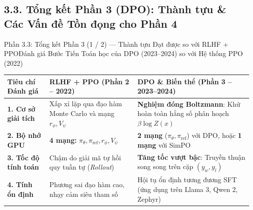 \subsection{3.3. Tổng kết Phần 3 (DPO): Thành tựu \& Các Vấn đề Tồn đọng cho Phần 4}

\begin{frame}{Phần 3.3: Tổng kết Phần 3 (1 / 2) --- Thành tựu Đạt được so với RLHF + PPO}{Đánh giá Bước Tiến Toán học của DPO (2023--2024) so với Hệ thống PPO (2022)}
  \vspace{0.05cm}
  \footnotesize
  \renewcommand{\arraystretch}{1.32}
  \begin{tabularx}{\textwidth}{@{}p{3.4cm} X X@{}}
    \toprule
    \textbf{Tiêu chí Đánh giá} & \textbf{RLHF + PPO (Phần 2 -- 2022)} & \textbf{DPO \& Biến thể (Phần 3 -- 2023--2024)} \\
    \midrule
    \textbf{1. Cơ sở giải tích} & Xấp xỉ lặp qua đạo hàm Monte Carlo và mạng $r_\phi, V_\psi$ & \textbf{\textcolor{tealgreen}{Nghiệm đóng Boltzmann}}: Khử hoàn toàn hằng số phân hoạch $\beta \log Z(x)$ \\
    \hline
    \textbf{2. Bộ nhớ GPU} & \textbf{4 mạng:} $\pi_\theta, \pi_{\text{ref}}, r_\phi, V_\psi$ & \textbf{\textcolor{tealgreen}{2 mạng}} ($\pi_\theta, \pi_{\text{ref}}$) với DPO, hoặc \textbf{1 mạng} với SimPO \\
    \hline
    \textbf{3. Tốc độ tính toán} & Chậm do giải mã tự hồi quy tuần tự (\textit{Rollout}) & \textbf{\textcolor{tealgreen}{Tăng tốc vượt bậc}}: Truyền thuận song song trên cặp $(y_w, y_l)$ \\
    \hline
    \textbf{4. Tính ổn định} & Phương sai đạo hàm cao, nhạy cảm siêu tham số & Hội tụ ổn định tương đương SFT (ứng dụng trên Llama 3, Qwen 2, Zephyr) \\
    \bottomrule
  \end{tabularx}
\end{frame}

